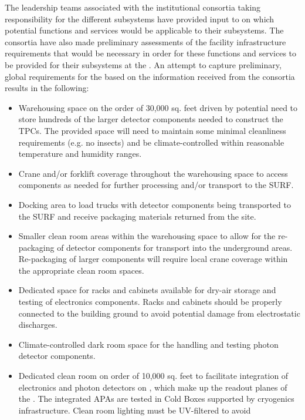 The leadership teams associated with the  institutional
consortia taking responsibility for the different 
subsystems have provided input to  on which potential
 functions and services would be applicable to their
subsystems.  The consortia have also made preliminary assessments of
the facility infrastructure requirements that would be necessary in
order for these functions and services to be provided for their
subsystems at the .  An attempt to capture preliminary,
global requirements for the  based on the information
received from the consortia results in the following:
\begin{itemize}
  \item Warehousing space on the order of 30,000 sq. feet driven by
    potential need to store hundreds of the larger detector components
    needed to construct the TPCs.  The provided space will need to
    maintain some minimal cleanliness requirements (e.g. no insects)
    and be climate-controlled within reasonable temperature and
    humidity ranges.
  \item Crane and/or forklift coverage throughout the warehousing
    space to access components as needed for further processing and/or
    transport to the SURF.
  \item Docking area to load trucks with detector components being
    transported to the SURF and receive packaging materials
    returned from the site.
  \item Smaller clean room areas within the warehousing space to
    allow for the re-packaging of detector components for transport
    into the underground areas.  Re-packaging of larger components
    will require local crane coverage within the appropriate clean room
    spaces.
  \item Dedicated space for racks and cabinets available for dry-air
    storage and testing of electronics components.  Racks and cabinets
    should be properly connected to the building ground to avoid
    potential damage from electrostatic discharges.
  \item Climate-controlled dark room space for the handling and
    testing photon detector components.
  \item Dedicated clean room on order of 10,000 sq. feet to facilitate
    integration of electronics and photon detectors on ,
    which make up the readout planes of the  . The
    integrated APAs are tested in Cold Boxes supported by cryogenics
    infrastructure.  Clean room lighting must be UV-filtered to avoid

\end{itemize}
